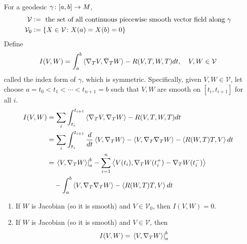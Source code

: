 \begin{enumerate}[label=\arabic{*}.]
	For a geodesic $\gamma \colon [a,b] \rightarrow M$,
	\begin{equation*}
		\begin{aligned}
			\mathcal{V} &\vcentcolon= \text{ the set of all continuous piecewise smooth vector field along } \gamma\\
			\mathcal{V}_0 &\vcentcolon= \left\{X \in \mathcal{V} \colon X(a) = X(b) = 0\right\}
		\end{aligned}
	\end{equation*}
	Define
	\begin{equation*}
		I(V,W) = \int_a^b\left\langle \nabla_TV,\nabla_TW \right\rangle-R(V,T,W,T)dt,\quad V,W \in \mathcal{V}
	\end{equation*}
	called the index form of $\gamma$, which is symmetric. Specifically, given $V,W \in \mathcal{V}$, let choose $a=t_0 < t_1 < \cdots < t_{n+1} = b$ such that $V,W$ are smooth on $[t_i,t_{i+1}]$ for all $i$.
	\begin{equation*}
		\begin{aligned}
			I(V,W) &= \sum_i \int_{t_i}^{t_{i+1}} \left\langle \nabla_TV,\nabla_TW \right\rangle-R(V,T,W,T)dt \\
			&= \sum_i \int_{t_i}^{t_{i+1}} \frac{d}{dt}\left\langle V,\nabla_TW \right\rangle-\left\langle V,\nabla_T\nabla_TW \right\rangle-\left\langle R(W,T)T,V \right\rangle dt\\
			&= \left.\left\langle V,\nabla_TW \right\rangle\right\lvert_a^b-\sum_{i=1}^{n} \left\langle V(t_i),\nabla_TW(t_{i}^+)-\nabla_TW(t_{i}^-) \right\rangle\\
			&\quad-\int_{a}^{b}\left\langle V,\nabla_T\nabla_TW \right\rangle-\left\langle R(W,T)T,V \right\rangle dt 
		\end{aligned}
	\end{equation*}
	\begin{rmk}
		\begin{enumerate}[label=(\roman{*})]
			\item If $W$ is Jacobian (so it is smooth) and $V \in \mathcal{V}_0$, then $I(V,W) = 0$.

			\item If $W$ is Jacobian (so it is smooth) and $V \in \mathcal{V}$, then
			\begin{equation*}
				I(V,W) = \left.\left\langle V,\nabla_TW \right\rangle\right\lvert_a^b
			\end{equation*}


\end{enumerate}
\end{rmk}
\end{enumerate}
